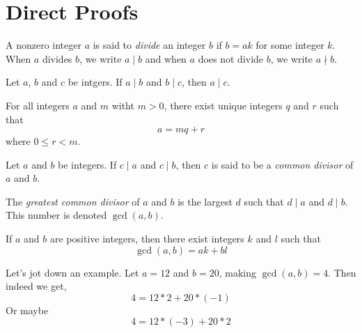 \chapter{Direct Proofs}

\begin{definition}
	\label{div}
	A nonzero integer $a$ is said to \emph{divide} an integer $b$ if $b = ak$ for some integer $k$. When $a$ divides $b$, we write $a \mid b$ and when $a$ does not divide $b$, we write $a \nmid b$.
\end{definition}

\begin{proposition} \label{transdiv}
	Let $a$, $b$ and $c$ be intgers. If $a \mid b$ and $b \mid c$, then $a \mid c$.
\end{proposition}

\begin{theorem} \label{divalgo}
	For all integers $a$ and $m$ witht $m > 0$, there exist unique integers $q$ and $r$ such that 
	$$a = mq+r$$
	where $0 \leq r < m$.
\end{theorem}

\begin{definition} \label{gcd}
	Let $a$ and $b$ be integers. If $c \mid a$ and $c \mid b$, then $c$ is said to be a \emph{common divisor} of $a$ and $b$.

	The \emph{greatest common divisor} of $a$ and $b$ is the largest $d$ such that $d \mid a$ and $d \mid b$. This number is denoted $\gcd(a,b)$.
\end{definition}

\begin{theorem} \label{gcdalgo}
	If $a$ and $b$ are positive integers, then there exist integers $k$ and $l$ such that $$\gcd(a,b) = ak + bl$$
\end{theorem}

\begin{scratch}
Let's jot down an example. Let $a = 12$ and $b = 20$, making $\gcd(a, b) = 4$.
Then indeed we get, $$4 = 12*2 + 20*(-1)$$
Or maybe $$4 = 12*(-3) + 20*2$$
\end{scratch}

